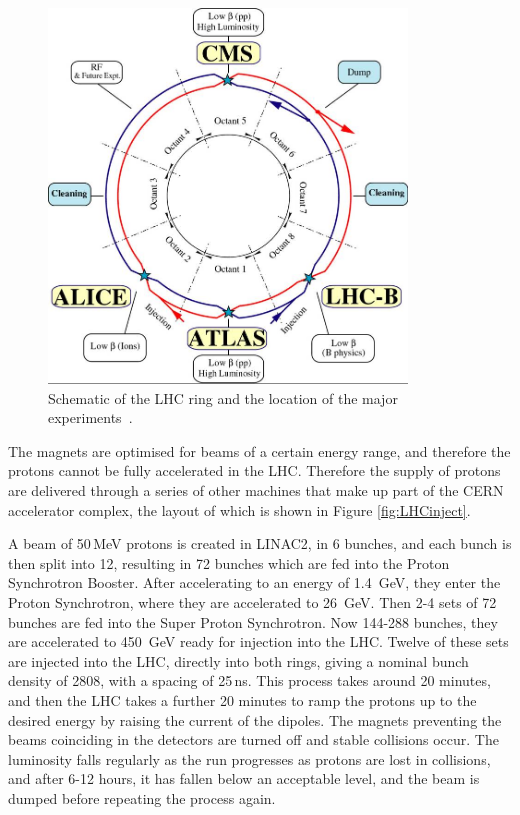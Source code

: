 \begin{figure}[htbp]
\centering
\includegraphics[width=0.85\textwidth]{Figures/Detector/lhc-schematic}
\caption[Schematic of the LHC ring and the location of the major experiments.]{Schematic of the LHC ring and the location of the major experiments~\cite{LHCConcept}.}
\label{fig:LHC}
\end{figure}


The magnets are optimised for beams of a certain energy range, and therefore the protons cannot be fully accelerated in the LHC. Therefore the supply of protons are delivered through a series of other machines that make up part of the CERN accelerator complex, the layout of which is shown in Figure \ref{fig:LHCinject}. 

A beam of 50\,MeV protons is created in LINAC2, in 6 bunches, and each bunch is then split into 12, resulting in 72 bunches which are fed into the Proton Synchrotron Booster. After accelerating to an energy of 1.4~GeV, they enter the Proton Synchrotron, where they are accelerated to 26~GeV. Then 2-4 sets of 72 bunches are fed into the Super Proton Synchrotron. Now 144-288 bunches, they are accelerated to 450~GeV ready for injection into the LHC. Twelve of these sets are injected into the LHC, directly into both rings, giving a nominal bunch density of 2808, with a spacing of 25\,ns. This process takes around 20 minutes, and then the LHC takes a further 20 minutes to ramp the protons up to the desired energy by raising the current of the dipoles. The magnets preventing the beams coinciding in the detectors are turned off and stable collisions occur. The luminosity falls regularly as the run progresses as protons are lost in collisions, and after 6-12 hours, it has fallen below an acceptable level, and the beam is dumped before repeating the process again. 

